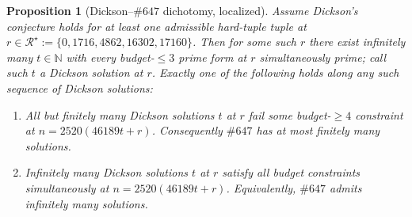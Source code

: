 \documentclass[11pt]{article}
\renewcommand{\_}{\origunderscore\allowbreak}
\newtheorem{proposition}[theorem]{Proposition}
\theoremstyle{definition}
\theoremstyle{remark}
\begin{document}
\begin{proposition}[Dickson--$\#647$ dichotomy, localized]\label{prop:dichotomy}
Assume Dickson's conjecture holds for at least one admissible
hard-tuple tuple at $r\in\mathcal{R}^\star:=\{0,1716,4862,16302,17160\}$.
Then for some such $r$ there exist infinitely many $t\in\mathbb{N}$
with every budget-$\le 3$ prime form at $r$ simultaneously prime;
call such $t$ a \emph{Dickson solution at $r$}. Exactly one of the
following holds along any such sequence of Dickson solutions:
\begin{enumerate}
\item[\emph{(A)}] All but finitely many Dickson solutions $t$ at $r$
  fail some budget-$\ge 4$ constraint at $n=2520(46189t+r)$.
  Consequently $\#647$ has at most finitely many solutions.
\item[\emph{(B)}] Infinitely many Dickson solutions $t$ at $r$
  satisfy all budget constraints simultaneously at
  $n=2520(46189t+r)$. Equivalently, $\#647$ admits infinitely many
  solutions.
\end{enumerate}
\end{proposition}
\end{document}
